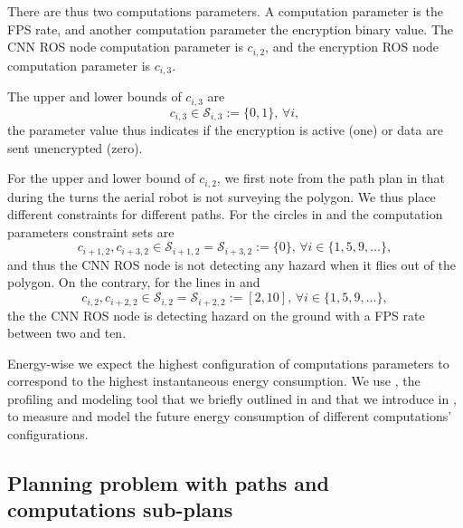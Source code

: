 There are thus two computations parameters. A computation parameter is the FPS rate, and another computation parameter the encryption binary value. The CNN ROS node computation parameter is $c_{i,2}$, and the encryption ROS node computation parameter is $c_{i,3}$.

The upper and lower bounds of $c_{i,3}$ are 
\begin{equation}
  c_{i,3}\in\mathcal{S}_{i,3}:=\{0,1\},\,\forall i,
\end{equation}
the parameter value thus indicates if the encryption is active (one) or data are sent unencrypted (zero).

For the upper and lower bound of $c_{i,2}$, we first note from the path plan in  that during the turns the aerial robot is not surveying the polygon. We thus place different constraints for different paths. For the circles in  and  the computation parameters constraint sets are 
\begin{equation}\label{eq:cnn-comp-const}
  c_{i+1,2},c_{i+3,2}\in\mathcal{S}_{i+1,2}=\mathcal{S}_{i+3,2}:=\{0\},\,\forall i\in\{1,5,9,\dots\},
\end{equation}
and thus the CNN ROS node is not detecting any hazard when it flies out of the polygon. On the contrary, for the lines in  and  
\begin{equation}\label{eq:encr-comp-const}
c_{i,2},c_{i+2,2}\in\mathcal{S}_{i,2}=\mathcal{S}_{i+2,2}:=[2,10],\,\forall i\in\{1,5,9,\dots\},
\end{equation} 
the the CNN ROS node is detecting hazard on the ground with a FPS rate between two and ten.

Energy-wise we expect the highest configuration of computations parameters to correspond to the highest instantaneous energy consumption. We use \powprof{}, the profiling and modeling tool that we briefly outlined in  and that we introduce in , to measure and model the future energy consumption of different computations' configurations.

\subsection{Planning problem with paths and computations sub-plans}

